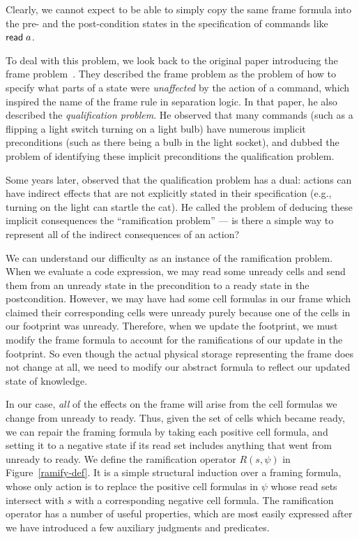 \documentclass[preprint,natbib]{sigplanconf}
\begin{document}
Clearly, we cannot expect to be able to simply copy the same frame
formula into the pre- and the post-condition states in the
specification of commands like $\mbox{\textsf{{read}}}\; a$.

To deal with this problem, we look back to the original paper
introducing the frame problem~\cite{mccarthy}. They described the
frame problem as the problem of how to specify what parts of a state
were \emph{unaffected} by the action of a command, which inspired the
name of the frame rule in separation logic. In that paper, he also
described the \emph{qualification problem}. He observed that many
commands (such as a flipping a light switch turning on a light bulb)
have numerous implicit preconditions (such as there being a bulb in
the light socket), and dubbed the problem of identifying these
implicit preconditions the qualification problem.

Some years later, \citet{finger} observed that the qualification
problem has a dual: actions can have indirect effects that are not
explicitly stated in their specification (e.g., turning on the light can
startle the cat). He called the problem of deducing these implicit
consequences the ``ramification problem'' --- is there a simple way to
represent all of the indirect consequences of an action?

We can understand our difficulty as an instance of the ramification
problem. When we evaluate a code expression, we may read some unready
cells and send them from an unready state in the precondition to a ready
state in the postcondition. However, we may have had some cell formulas in
our frame which claimed their corresponding cells were unready purely
because one of the cells in our footprint was unready. Therefore, when
we update the footprint, we must modify the frame formula to account
for the ramifications of our update in the footprint. So even though
the actual physical storage representing the frame does not change at all, 
we need to modify our abstract formula to reflect our updated state
of knowledge. 

In our case, \emph{all} of the effects on the frame will arise from
the cell formulas we change from unready to ready. Thus, given the set of cells
which became ready, we can repair the framing formula by taking each
positive cell formula, and setting it to a negative state if its read
set includes anything that went from unready to ready. We define the
ramification operator $R(s, \psi)$ in Figure~\ref{ramify-def}.  It is
a simple structural induction over a framing formula, whose only
action is to replace the positive cell formulas in $\psi$ whose read
sets intersect with $s$ with a corresponding negative cell formula.
The ramification operator has a number of useful properties, which are
most easily expressed after we have introduced a few auxiliary
judgments and predicates.
\end{document}
